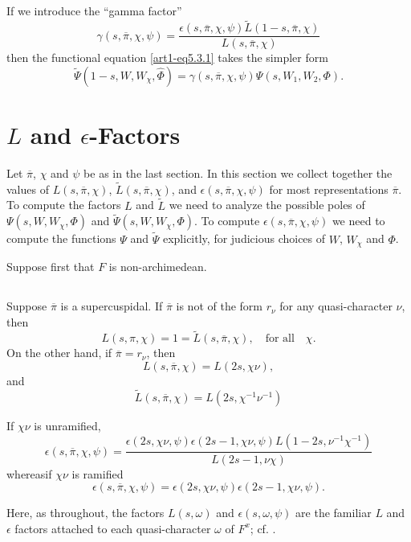 \subsection{}\label{art01-sec5.5}
If we introduce the ``gamma factor''
$$
\gamma(s,\overline{\pi},\chi,\psi)=\dfrac{\epsilon(s,\overline{\pi},\chi,\psi)\widetilde{L}(1-s,\overline{\pi},\chi)}{L(s,\overline{\pi},\chi)}
$$
then the functional equation \eqref{art1-eq5.3.1} takes the simpler form
$$
\widetilde{\Psi}(1-s,W,W_{\chi},\widehat{\Phi})=\gamma(s,\overline{\pi},\chi,\psi)\Psi(s,W_{1},W_{2},\Phi).
$$

\section{$L$ and $\epsilon$-Factors}\label{art1-sec6}

Let $\overline{\pi}$, $\chi$ and $\psi$ be as in the last section. In this section we collect together the values of $L(s,\overline{\pi},\chi)$, $\widetilde{L}(s,\overline{\pi},\chi)$, and $\epsilon(s,\overline{\pi},\chi,\psi)$ for most representations $\overline{\pi}$. To compute the factors $L$ and $\widetilde{L}$ we need to analyze the possible poles of $\Psi(s,W,W_{\chi},\Phi)$ and $\widetilde{\Psi}(s,W,W_{\chi},\Phi)$. To compute $\epsilon(s,\overline{\pi},\chi,\psi)$ we need to compute the functions $\Psi$ and $\widetilde{\Psi}$ explicitly, for judicious choices of $W$, $W_{\chi}$ and $\Phi$.

Suppose first that $F$ is non-archimedean.

\subsection{}\label{art1-sec6.1}
Suppose $\overline{\pi}$ is a supercuspidal. If $\overline{\pi}$ is not of the form $r_{\nu}$ for any quasi-character $\nu$, then
$$
L(s,\pi,\chi)=1=\widetilde{L}(s,\overline{\pi},\chi),\quad\text{for all}\quad \chi.
$$
On the other hand, if $\overline{\pi}=r_{\nu}$, then
$$
L(s,\overline{\pi},\chi)=L(2s,\chi\nu),
$$
and
$$
\widetilde{L}(s,\overline{\pi},\chi)=L(2s,\chi^{-1}\nu^{-1})
$$

If $\chi\nu$ is unramified,
$$
\epsilon(s,\overline{\pi},\chi,\psi)=\frac{\epsilon(2s,\chi\nu,\psi)\epsilon(2s-1,\chi\nu,\psi)L(1-2s,\nu^{-1}\chi^{-1})}{L(2s-1,\nu\chi)}
$$
whereas\pageoriginale if $\chi\nu$ is ramified
$$
\epsilon(s,\overline{\pi},\chi,\psi)=\epsilon(2s,\chi\nu,\psi)\epsilon(2s-1,\chi\nu,\psi).
$$

Here, as throughout, the factors $L(s,\omega)$ and $\epsilon(s,\omega,\psi)$ are the familiar $L$ and $\epsilon$ factors attached to each quasi-character $\omega$ of $F^{x}$; cf. \cite[pp. 108-109]{Jacquet-Langlands}.

